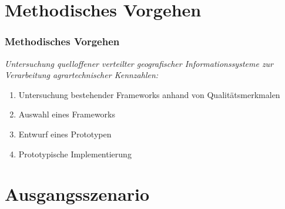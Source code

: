 \documentclass{beamer}
\begin{document}
\section{Methodisches Vorgehen}

\begin{frame}\frametitle{Methodisches Vorgehen}
\textit{Untersuchung quelloffener verteilter geografischer Informationssysteme zur Verarbeitung agrartechnischer Kennzahlen:}\\
\begin{enumerate} %
\item Untersuchung bestehender Frameworks anhand von Qualitätsmerkmalen
\item Auswahl eines Frameworks
\item Entwurf eines Prototypen %
\item Prototypische Implementierung %
\end{enumerate}
\end{frame}

\section{Ausgangsszenario}
\end{document}
